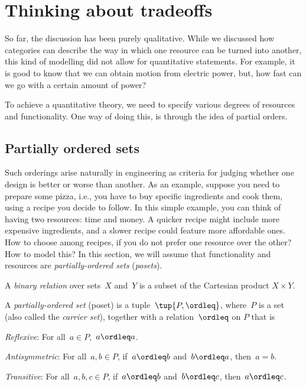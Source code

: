 \section{Thinking about tradeoffs}
So far, the discussion has been purely qualitative. While we discussed how
categories can describe the way in which one resource can be turned into another,
this kind of modelling did not allow for quantitative statements. For example, it
is good to know that we can obtain motion from electric power, but, how fast can
we go with a certain amount of power?

To achieve a quantitative theory, we need to specify various degrees of resources and functionality.
One way of doing this, is through the idea of partial orders.

\subsection{Partially ordered sets}
Such orderings arise naturally in engineering as criteria for judging whether one design is better or worse than another. As an example, suppose you need to prepare some pizza, i.e., you have to buy specific ingredients and cook them, using a recipe you decide to follow. In this simple example, you can think of having two resources: time and money. A quicker recipe might include more expensive ingredients, and a slower recipe could feature more affordable ones. How to choose among recipes, if you do not prefer one resource over the other? How to model this? In this section, we will assume that functionality and resources
are \emph{partially-ordered sets} (\emph{posets}).

\begin{definition}
A \emph{binary relation} over sets~$X$ and~$Y$ is a subset of the Cartesian product $X\times Y$.
\end{definition}

\begin{definition}
\label{def:poset}
A \emph{partially-ordered set} (poset) is a tuple~$\tup{P, \ordleq}$,
where~$P$ is a set (also called the \emph{carrier set}), together with a
relation~$\ordleq$ on $P$ that is
\begin{compactenum}
    \item \emph{Reflexive}: For all~$a\in P$,~$a\ordleq a$.
    \item \emph{Antisymmetric}: For all~$a,b\in P$, if~$a\ordleq b$ and~$b\ordleq a$, then~$a=b$.
    \item \emph{Transitive}: For all~$a,b,c\in P$, if~$a\ordleq b$ and~$b\ordleq c$, then~$a\ordleq c$.
\end{compactenum}
\end{definition}

